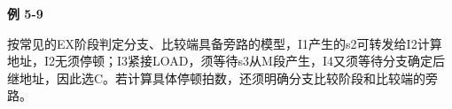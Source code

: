 {\color{ink}\bfseries 例 5-9}\par\vspace{1bp}按常见的EX阶段判定分支、比较端具备旁路的模型，I1产生的s2可转发给I2计算地址，I2无须停顿；I3紧接LOAD，须等待s3从M段产生，I4又须等待分支确定后继地址，因此选C。若计算具体停顿拍数，还须明确分支比较阶段和比较端的旁路。
